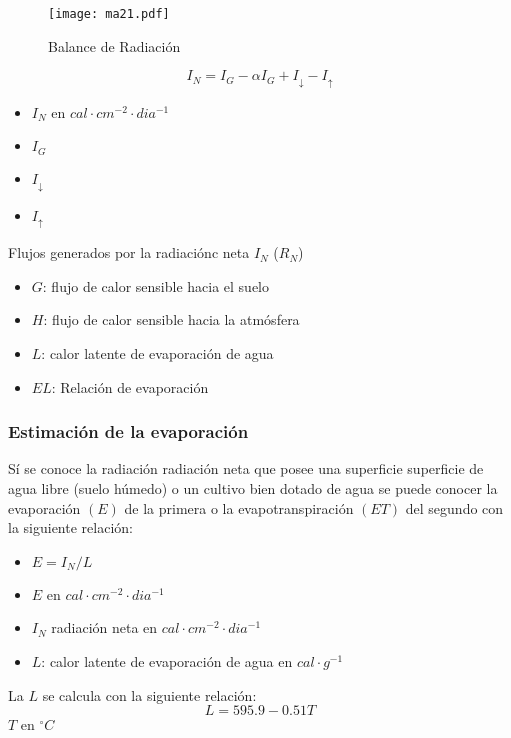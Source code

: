 \begin{figure}[h!]
\centering
  \texttt{[image: ma21.pdf]}
  \caption{Balance de Radiación}
  \label{ma21}
\end{figure}
\begin{equation}
    I_N = I_G-\alpha I_G +I_{\downarrow } - I_{\uparrow }
\end{equation}
\begin{notation}
    \begin{itemize}
        \item $I_N$ en $cal\cdot cm^{-2}\cdot dia^{-1}$
        \item $I_G$
        \item $I_{\downarrow }$
        \item $I_{\uparrow }$
    \end{itemize}
\end{notation}

Flujos generados por la radiaciónc neta $I_N$ ($R_N$)
\begin{notation}
    \begin{itemize}
        \item $G$: flujo de calor sensible hacia el suelo
        \item $H$: flujo de calor sensible hacia la atmósfera
        \item $L$: calor latente de evaporación de agua        
        \item $EL$: Relación de evaporación
    \end{itemize}
\end{notation}

\subsubsection{Estimación de la evaporación}

Sí se conoce la radiación radiación neta que posee una superficie superficie de agua libre (suelo húmedo) o un cultivo bien dotado de agua se puede conocer la evaporación $(E)$ de la primera o la evapotranspiración $(ET)$ del segundo con la siguiente relación:
\begin{notation}
    \begin{itemize}
        \item $E=I_N/L$
        \item $E$ en $cal\cdot cm^{-2}\cdot dia^{-1}$
        \item $I_N$ radiación neta en $cal\cdot cm^{-2}\cdot dia^{-1}$
        \item $L$: calor latente de evaporación de agua en $cal\cdot g^{-1}$      
    \end{itemize}
\end{notation}
La $L$ se calcula con la siguiente relación:
\begin{equation}
    L = 595.9 - 0.51T
\end{equation}
$T$ en $^{\circ}C$

